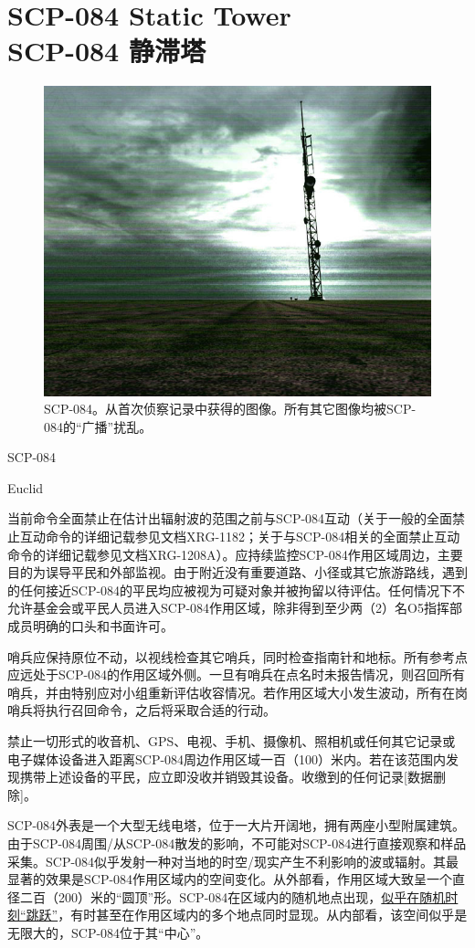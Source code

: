 \chapter[SCP-084 静滞塔]{
    SCP-084 Static Tower\\
    SCP-084 静滞塔
}

\label{chap:SCP-084}

\begin{figure}[H]
    \centering
    \includegraphics[width=0.5\linewidth]{images/SCP-084.jpg}
    \caption*{SCP-084。从首次侦察记录中获得的图像。所有其它图像均被SCP-084的“广播”扰乱。}
\end{figure}

SCP-084

Euclid

当前命令全面禁止在估计出辐射波的范围之前与SCP-084互动（关于一般的全面禁止互动命令的详细记载参见文档XRG-1182；关于与SCP-084相关的全面禁止互动命令的详细记载参见文档XRG-1208A）。应持续监控SCP-084作用区域周边，主要目的为误导平民和外部监视。由于附近没有重要道路、小径或其它旅游路线，遇到的任何接近SCP-084的平民均应被视为可疑对象并被拘留以待评估。任何情况下不允许基金会或平民人员进入SCP-084作用区域，除非得到至少两（2）名O5指挥部成员明确的口头和书面许可。

哨兵应保持原位不动，以视线检查其它哨兵，同时检查指南针和地标。所有参考点应远处于SCP-084的作用区域外侧。一旦有哨兵在点名时未报告情况，则召回所有哨兵，并由特别应对小组重新评估收容情况。若作用区域大小发生波动，所有在岗哨兵将执行召回命令，之后将采取合适的行动。

禁止一切形式的收音机、GPS、电视、手机、摄像机、照相机或任何其它记录或电子媒体设备进入距离SCP-084周边作用区域一百（100）米内。若在该范围内发现携带上述设备的平民，应立即没收并销毁其设备。收缴到的任何记录{[}数据删除]。

SCP-084外表是一个大型无线电塔，位于一大片开阔地，拥有两座小型附属建筑。由于SCP-084周围\slash 从SCP-084散发的影响，不可能对SCP-084进行直接观察和样品采集。SCP-084似乎发射一种对当地的时空\slash 现实产生不利影响的波或辐射。其最显著的效果是SCP-084作用区域内的空间变化。从外部看，作用区域大致呈一个直径二百（200）米的“圆顶”形。SCP-084在区域内的随机地点出现，\hyperref[chap:SCP-2675]{似乎在随机时刻“跳跃”}，有时甚至在作用区域内的多个地点同时显现。从内部看，该空间似乎是无限大的，SCP-084位于其“中心”。

